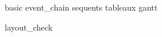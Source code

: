 \documentclass[12pt]{book}
\title{\fulltitle}
\author{\fullauthor}
\begin{document}
\frontmatter
\maketitle
\tableofcontents
{}

\mainmatter
\setlength{\parskip}{1.5em}

{basic}
{event_chain}
{sequents}
{tableaux}
{gantt}

\appendix

{layout_check}

\backmatter
\nocite{*}


\end{document}

